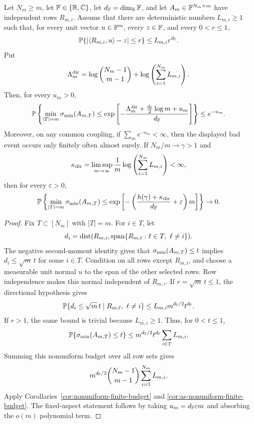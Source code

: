 \begin{corollary}\label{cor:directional-row-lower}
Let \(N_m\ge m\), let \(\mathbb{F}\in\{\mathbb{R},\mathbb{C}\}\), let \(d_{\mathbb{F}}=\dim_{\mathbb{R}}\mathbb{F}\), and let
\(A_m\in\mathbb{F}^{N_m\times m}\) have independent rows \(R_{m,i}\).  Assume that
there are deterministic numbers \(L_{m,i}\ge1\) such that, for every unit vector
\(u\in\mathbb{F}^m\), every \(z\in\mathbb{F}\), and every \(0<r\le1\),
\[
  \mathbb{P}\{|\langle R_{m,i},u\rangle-z|\le r\}\le L_{m,i}r^{d_{\mathbb{F}}}.
\]
Put
\[
  \Lambda_m^{\rm dir}
  =
  \log\binom{N_m-1}{m-1}
  +\log\left(\sum_{i=1}^{N_m}L_{m,i}\right).
\]
Then, for every \(u_m>0\),
\[
  \mathbb{P}\left\{
  \min_{|T|=m}\sigma_{\min}(A_{m,T})
  \le
  \exp\left[-\frac{\Lambda_m^{\rm dir}
    +\frac{d_{\mathbb{F}}}{2}\log m+u_m}{d_{\mathbb{F}}}\right]\right\}
  \le e^{-u_m}.
\]
Moreover, on any common coupling, if \(\sum_m e^{-u_m}<\infty\), then the
displayed bad event occurs only finitely often almost surely.  If
\(N_m/m\to\gamma>1\) and
\[
  \kappa_{\rm dir}
  =
  \limsup_{m\to\infty}
  \frac1m\log\left(\sum_{i=1}^{N_m}L_{m,i}\right)<\infty,
\]
then for every \(\varepsilon>0\),
\[
  \mathbb{P}\left\{
  \min_{|T|=m}\sigma_{\min}(A_{m,T})
  \le
  \exp\left[-\left(\frac{h(\gamma)+\kappa_{\rm dir}}{d_{\mathbb{F}}}
       +\varepsilon\right)m\right]\right\}\to0 .
\]
\end{corollary}

\begin{proof}
Fix \(T\subset[N_m]\) with \(|T|=m\).  For \(i\in T\), let
\[
  d_i=\dist(R_{m,i},\spn\{R_{m,\ell}:\ell\in T,\ \ell\ne i\}).
\]
The negative second-moment identity gives that \(\sigma_{\min}(A_{m,T})\le t\) implies
\(d_i\le\sqrt m\,t\) for some \(i\in T\).  Condition on all rows except
\(R_{m,i}\), and choose a measurable unit normal \(u\) to the span of the other
selected rows.  Row independence makes this normal independent of \(R_{m,i}\).
If \(r=\sqrt m\,t\le1\), the directional hypothesis gives
\[
  \mathbb{P}\{d_i\le\sqrt m\,t\mid R_{m,\ell},\ \ell\ne i\}
  \le L_{m,i}m^{d_{\mathbb{F}}/2}t^{d_{\mathbb{F}}}.
\]
If \(r>1\), the same bound is trivial because \(L_{m,i}\ge1\).  Thus, for
\(0<t\le1\),
\[
  \mathbb{P}\{\sigma_{\min}(A_{m,T})\le t\}
  \le m^{d_{\mathbb{F}}/2}t^{d_{\mathbb{F}}}\sum_{i\in T}L_{m,i}.
\]
Summing this nonuniform budget over all row sets gives
\[
  m^{d_{\mathbb{F}}/2}
  \binom{N_m-1}{m-1}\sum_{i=1}^{N_m}L_{m,i}.
\]
Apply Corollaries~\ref{cor:nonuniform-finite-budget} and
\ref{cor:as-nonuniform-finite-budget}.  The fixed-aspect statement follows by
taking \(u_m=d_{\mathbb{F}}\varepsilon m\) and absorbing the \(o(m)\) polynomial term.
\end{proof}

